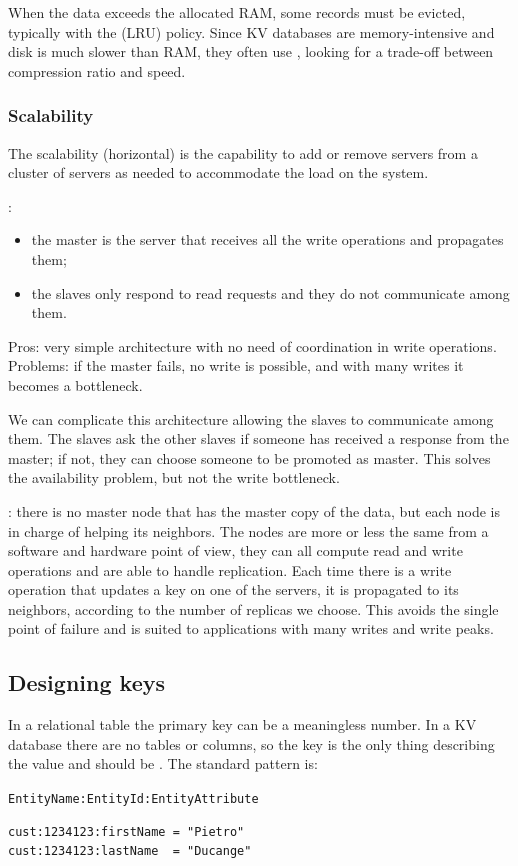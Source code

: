 When the data exceeds the allocated RAM, some records must be evicted, typically with the  (LRU) policy. Since KV databases are memory-intensive and disk is much slower than RAM, they often use , looking for a trade-off between compression ratio and speed.

\subsubsection{Scalability}
\begin{definition}
The scalability (horizontal) is the capability to add or remove servers from a cluster of servers as needed to accommodate the load on the system.
\end{definition}

:
\begin{itemize}
    \item the master is the server that receives all the write operations and propagates them;
    \item the slaves only respond to read requests and they do not communicate among them.
\end{itemize}
Pros: very simple architecture with no need of coordination in write operations. Problems: if the master fails, no write is possible, and with many writes it becomes a bottleneck.

We can complicate this architecture allowing the slaves to communicate among them. The slaves ask the other slaves if someone has received a response from the master; if not, they can choose someone to be promoted as master. This solves the availability problem, but not the write bottleneck.

: there is no master node that has the master copy of the data, but each node is in charge of helping its neighbors. The nodes are more or less the same from a software and hardware point of view, they can all compute read and write operations and are able to handle replication. Each time there is a write operation that updates a key on one of the servers, it is propagated to its neighbors, according to the number of replicas we choose. This avoids the single point of failure and is suited to applications with many writes and write peaks.

\subsection{Designing keys}
In a relational table the primary key can be a meaningless number. In a KV database there are no tables or columns, so the key is the only thing describing the value and should be . The standard pattern is:
\begin{center}
\texttt{EntityName:EntityId:EntityAttribute}
\end{center}
\begin{lstlisting}
cust:1234123:firstName = "Pietro"
cust:1234123:lastName  = "Ducange"
\end{lstlisting}

